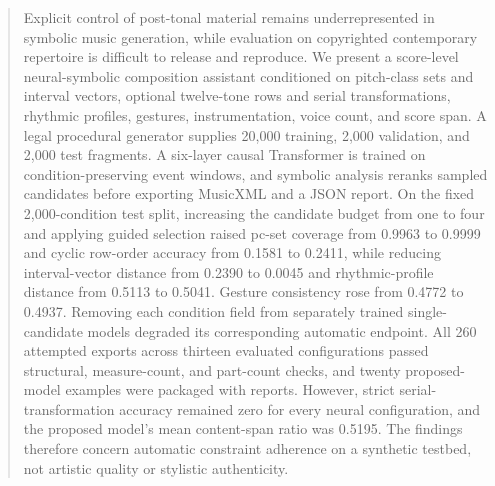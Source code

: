 \begin{abstract}
Explicit control of post-tonal material remains underrepresented in symbolic music generation, while evaluation on copyrighted contemporary repertoire is difficult to release and reproduce. We present a score-level neural-symbolic composition assistant conditioned on pitch-class sets and interval vectors, optional twelve-tone rows and serial transformations, rhythmic profiles, gestures, instrumentation, voice count, and score span. A legal procedural generator supplies 20,000 training, 2,000 validation, and 2,000 test fragments. A six-layer causal Transformer is trained on condition-preserving event windows, and symbolic analysis reranks sampled candidates before exporting MusicXML and a JSON report. On the fixed 2,000-condition test split, increasing the candidate budget from one to four and applying guided selection raised pc-set coverage from 0.9963 to 0.9999 and cyclic row-order accuracy from 0.1581 to 0.2411, while reducing interval-vector distance from 0.2390 to 0.0045 and rhythmic-profile distance from 0.5113 to 0.5041. Gesture consistency rose from 0.4772 to 0.4937. Removing each condition field from separately trained single-candidate models degraded its corresponding automatic endpoint. All 260 attempted exports across thirteen evaluated configurations passed structural, measure-count, and part-count checks, and twenty proposed-model examples were packaged with reports. However, strict serial-transformation accuracy remained zero for every neural configuration, and the proposed model's mean content-span ratio was 0.5195. The findings therefore concern automatic constraint adherence on a synthetic testbed, not artistic quality or stylistic authenticity.
\end{abstract}
